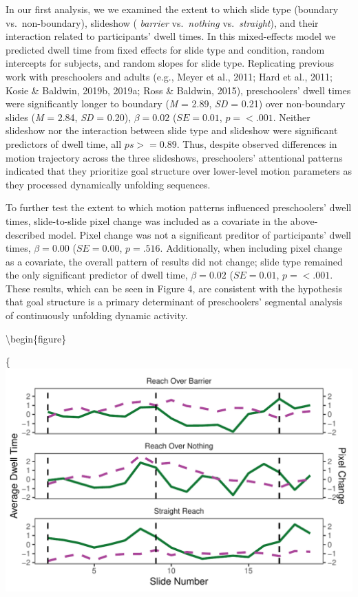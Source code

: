 \documentclass[
  english,
  man,floatsintext]{apa6}
\begin{document}
In our first analysis, we we examined the extent to which slide type (boundary vs.~non-boundary), slideshow ( \emph{barrier} vs.~\emph{nothing} vs.~\emph{straight}), and their interaction related to participants' dwell times. In this mixed-effects model we predicted dwell time from fixed effects for slide type and condition, random intercepts for subjects, and random slopes for slide type. Replicating previous work with preschoolers and adults (e.g., Meyer et al., 2011; Hard et al., 2011; Kosie \& Baldwin, 2019b, 2019a; Ross \& Baldwin, 2015), preschoolers' dwell times were significantly longer to boundary (\emph{M} = 2.89, \emph{SD} = 0.21) over non-boundary slides (\emph{M} = 2.84, \emph{SD} = 0.20), \(\beta=0.02\) (\(SE=0.01\), \(p= < .001\). Neither slideshow nor the interaction between slide type and slideshow were significant predictors of dwell time, all \(ps >= 0.89\). Thus, despite observed differences in motion trajectory across the three slideshows, preschoolers' attentional patterns indicated that they prioritize goal structure over lower-level motion parameters as they processed dynamically unfolding sequences.

To further test the extent to which motion patterns influenced preschoolers' dwell times, slide-to-slide pixel change was included as a covariate in the above-described model. Pixel change was not a significant preditor of participants' dwell times, \(\beta=0.00\) (\(SE=0.00\), \(p=.516\). Additionally, when including pixel change as a covariate, the overall pattern of results did not change; slide type remained the only significant predictor of dwell time, \(\beta=0.02\) (\(SE=0.01\), \(p=< .001\). These results, which can be seen in Figure 4, are consistent with the hypothesis that goal structure is a primary determinant of preschoolers' segmental analysis of continuously unfolding dynamic activity.

\textbackslash begin\{figure\}

\{\centering \includegraphics{kg-paper_files/figure-latex/fig4-1}
\end{document}
